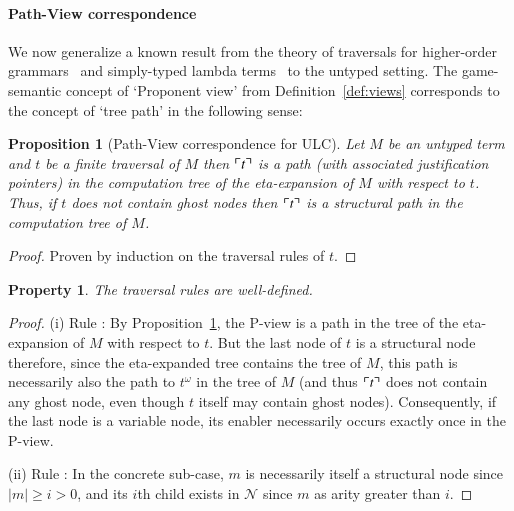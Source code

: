\documentclass{elsarticle}
\theoremstyle{plain}
\newtheorem{proposition}[theorem]{Proposition}
\newtheorem{property}[theorem]{Property}
\theoremstyle{definition}
\theoremstyle{remark}
\newcommand\Nodes{\mathcal{N}}%
\begin{document}
\paragraph{Path-View correspondence}
We now generalize a known result from the theory of traversals for higher-order grammars~\cite{Ong2006} and simply-typed lambda terms~\cite[Proposition 4.29]{BlumPhd} to the untyped setting. The game-semantic concept of `Proponent view' from Definition~\ref{def:views} corresponds to the concept of `tree path' in the following sense:

\begin{proposition}[Path-View correspondence for ULC]
\label{prop:pathview_ulc}
Let $M$ be an untyped term and $t$ be a \emph{finite} traversal of $M$ then
$\ulcorner t \urcorner$ is a path (with associated justification pointers) in the computation tree of the eta-expansion of $M$ with respect to $t$. Thus, if $t$ does not contain ghost nodes then $\ulcorner t \urcorner$ is a structural path in the computation tree of $M$.
\end{proposition}
\begin{proof}
Proven by induction on the traversal rules of $t$.
\end{proof}

\begin{property}
The traversal rules are well-defined.
\end{property}
\begin{proof}
(i) Rule : By Proposition~\ref{prop:pathview_ulc}, the P-view is a path in the tree of the eta-expansion of $M$ with respect to $t$. But the last node of $t$ is a structural node therefore, since the eta-expanded tree contains the tree of $M$, this path is necessarily also the path to $t^\omega$ in the tree of $M$ (and thus $\ulcorner t \urcorner$ does not contain any ghost node, even though $t$ itself may contain ghost nodes).
 Consequently, if the last node is a variable node, its enabler necessarily occurs exactly once in the P-view.

(ii) Rule : In the concrete sub-case, $m$ is necessarily itself a structural node since $|m|\geq i>0$, and its $i$th child exists in $\Nodes$ since $m$ as arity greater than $i$.
\end{proof}
\end{document}
